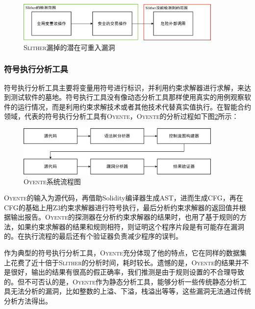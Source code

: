 \begin{figure}
\vspace{+2mm}
  \centering
  \includegraphics[width=0.9\textwidth]{figures/variant_reentrancy_pattern.png}
  \caption{\textsc{Slither}漏掉的潜在可重入漏洞}
  \label{fig:reentrancy_variant}
\vspace{-5mm}
\end{figure}



\subsubsection{符号执行分析工具}

符号执行分析工具主要将变量用符号进行标识，并利用约束求解器进行求解，来达到测试软件的墓地。符号执行工具没有像动态分析工具那样使用真实的用例观察软件的运行情况，而是利用约束求解技术或者其他技术代替真实值执行。在智能合约领域，代表的符号执行分析工具有\textsc{Oyente}，\textsc{Oyente}的分析过程如下图\ref{fig:oyente_process}所示：

\begin{figure}
\vspace{+2mm}
  \centering
  \includegraphics[width=0.9\textwidth]{figures/oyente_process.png}
  \caption{\textsc{Oyente}系统流程图}
  \label{fig:oyente_process}
\vspace{-5mm}
\end{figure}

\textsc{Oyente}的输入为源代码，再借助Solidity编译器生成AST，进而生成CFG，再在CFG的基础上用Z3约束求解器进行符号执行，最后分析约束求解器的返回值并根据输出报告。\textsc{Oyente}的探测器在分析约束求解器的结果时，也用了基于规则的方法，如果约束求解器的结果和规则相符，则证明这个程序片段是有可能存在漏洞的。在执行流程的最后还有个验证器负责减少程序的误判。

作为典型的符号执行分析工具，\textsc{Oyente}充分体现了他的特点，它在同样的数据集上花费了近十倍于\textsc{Slither}的分析时间，耗时较长。遗憾的是，\textsc{Oyente}的结果并不是很好，输出的结果有很高的假正确率，我们推测是由于规则设置的不合理导致的。但不可否认的是，\textsc{Oyente}作为静态分析工具，能够分析一些传统静态分析工具无法分析的漏洞，比如整数的上溢、下溢，栈溢出等等，这些漏洞无法通过传统分析方法得出。

